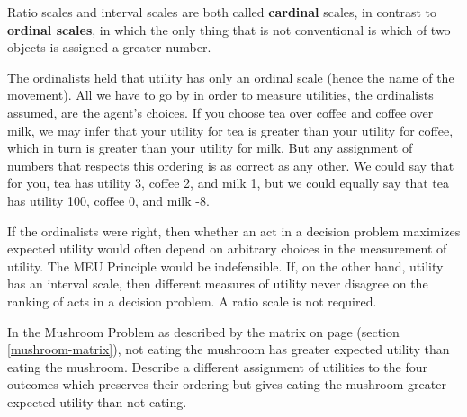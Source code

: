 
Ratio scales and interval scales are both called \textbf{cardinal} scales, in
contrast to \textbf{ordinal scales}, in which the only thing that is not
conventional is which of two objects is assigned a greater number.

The ordinalists held that utility has only an ordinal scale (hence the name of
the movement). All we have to go by in order to measure utilities, the
ordinalists assumed, are the agent's choices. If you choose tea over coffee and
coffee over milk, we may infer that your utility for tea is greater than your
utility for coffee, which in turn is greater than your utility for milk. But any
assignment of numbers that respects this ordering is as correct as any other. We
could say that for you, tea has utility 3, coffee 2, and milk 1, but we could
equally say that tea has utility 100, coffee 0, and milk -8.

If the ordinalists were right, then whether an act in a decision problem
maximizes expected utility would often depend on arbitrary choices in the
measurement of utility. The MEU Principle would be indefensible.
If, on the other hand, utility has an interval scale, then different measures of
utility never disagree on the ranking of acts in a decision problem. A ratio
scale is not required.

\begin{exercise}{1}
  In the Mushroom Problem as described by the matrix on page
  \pageref{mushroom-matrix} (section \ref{mushroom-matrix}), not eating the
  mushroom has greater expected utility than eating the mushroom. Describe a
  different assignment of utilities to the four outcomes which preserves their
  ordering but gives eating the mushroom greater expected utility than not
  eating.
\end{exercise}



